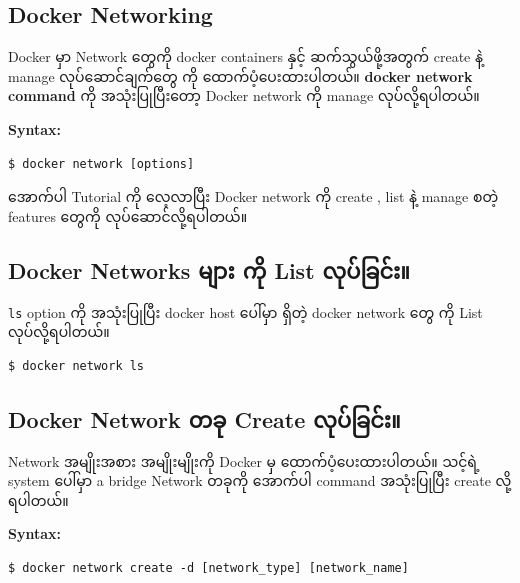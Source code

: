\documentclass[]{article}
\begin{document}
\hypertarget{docker-networking-1}{%
\subsection{Docker Networking}\label{docker-networking-1}}

Docker မှာ Network တွေကို docker containers နှင့် ဆက်သွယ်ဖို့အတွက်
create နဲ့ manage လုပ်ဆောင်ချက်တွေ ကို ထောက်ပံ့ပေးထားပါတယ်။
\textbf{docker network command} ကို အသုံးပြုပြီးတော့ Docker network ကို
manage လုပ်လို့ရပါတယ်။

\textbf{Syntax:}

\begin{verbatim}
$ docker network [options]
\end{verbatim}

အောက်ပါ Tutorial ကို လေ့လာပြီး Docker network ကို create , list နဲ့
manage စတဲ့ features တွေကို လုပ်ဆောင်လို့ရပါတယ်။

\hypertarget{docker-networks-ux1019ux103bux102cux1038-ux1000ux102dux102f-list-ux101cux102fux1015ux103aux1001ux103cux1004ux103aux1038}{%
\subsection{Docker Networks များ ကို List
လုပ်ခြင်း။}\label{docker-networks-ux1019ux103bux102cux1038-ux1000ux102dux102f-list-ux101cux102fux1015ux103aux1001ux103cux1004ux103aux1038}}

\texttt{ls} option ကို အသုံးပြုပြီး docker host ပေါ်မှာ ရှိတဲ့ docker
network တွေ ကို List လုပ်လို့ရပါတယ်။

\begin{verbatim}
$ docker network ls
\end{verbatim}

\hypertarget{docker-network-ux1010ux1001ux102f-create-ux101cux102fux1015ux103aux1001ux103cux1004ux103aux1038}{%
\subsection{Docker Network တခု Create
လုပ်ခြင်း။}\label{docker-network-ux1010ux1001ux102f-create-ux101cux102fux1015ux103aux1001ux103cux1004ux103aux1038}}

Network အမျိုးအစား အမျိုးမျိုးကို Docker မှ ထောက်ပံ့ပေးထားပါတယ်။ သင့်ရဲ့
system ပေါ်မှာ a bridge Network တခုကို အောက်ပါ command အသုံးပြုပြီး
create လို့ရပါတယ်။

\textbf{Syntax:}

\begin{verbatim}
$ docker network create -d [network_type] [network_name]
\end{verbatim}
\end{document}
